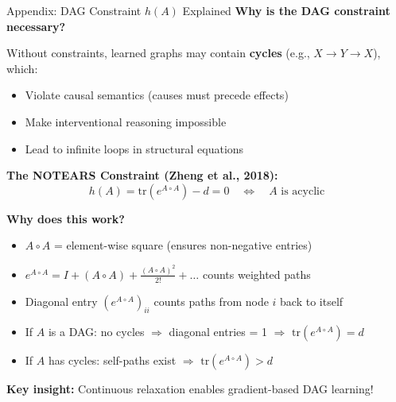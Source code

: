 \documentclass[aspectratio=169]{beamer}
\begin{document}
\begin{frame}{Appendix: DAG Constraint $h(A)$ Explained}
\textbf{Why is the DAG constraint necessary?}

\vspace{0.2cm}
Without constraints, learned graphs may contain \textbf{cycles} (e.g., $X \to Y \to X$), which:
\begin{itemize}
    \item Violate causal semantics (causes must precede effects)
    \item Make interventional reasoning impossible
    \item Lead to infinite loops in structural equations
\end{itemize}

\vspace{0.3cm}
\textbf{The NOTEARS Constraint (Zheng et al., 2018):}
\begin{equation*}
h(A) = \text{tr}(e^{A \circ A}) - d = 0 \quad \Leftrightarrow \quad A \text{ is acyclic}
\end{equation*}

\vspace{0.2cm}
\textbf{Why does this work?}
\begin{itemize}
    \item $A \circ A$ = element-wise square (ensures non-negative entries)
    \item $e^{A \circ A} = I + (A \circ A) + \frac{(A \circ A)^2}{2!} + \ldots$ counts weighted paths
    \item Diagonal entry $(e^{A \circ A})_{ii}$ counts paths from node $i$ back to itself
    \item If $A$ is a DAG: no cycles $\Rightarrow$ diagonal entries = 1 $\Rightarrow$ $\text{tr}(e^{A \circ A}) = d$
    \item If $A$ has cycles: self-paths exist $\Rightarrow$ $\text{tr}(e^{A \circ A}) > d$
\end{itemize}

\vspace{0.2cm}
\textbf{Key insight:} Continuous relaxation enables gradient-based DAG learning!
\end{frame}
\end{document}
